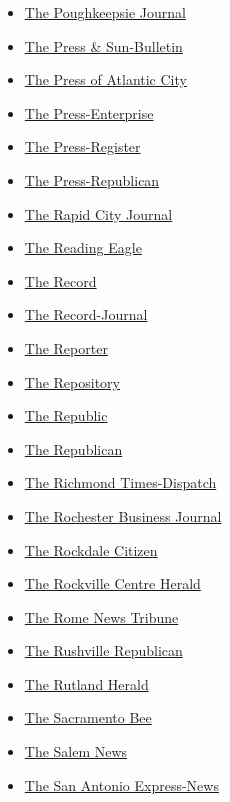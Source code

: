 \begin{itemize}
\item
  \href{https://www.poughkeepsiejournal.com/}{The Poughkeepsie Journal}
\item
  \href{https://www.pressconnects.com/}{The Press \& Sun-Bulletin}
\item
  \href{https://www.pressofatlanticcity.com/}{The Press of Atlantic
  City}
\item
  \href{https://www.pe.com/}{The Press-Enterprise}
\item
  \href{https://www.al.com/mobile/}{The Press-Register}
\item
  \href{https://www.pressrepublican.com/}{The Press-Republican}
\item
  \href{https://rapidcityjournal.com/}{The Rapid City Journal}
\item
  \href{https://www.readingeagle.com/}{The Reading Eagle}
\item
  \href{https://www.northjersey.com/}{The Record}
\item
  \href{https://www.myrecordjournal.com/}{The Record-Journal}
\item
  \href{https://dailyreporter.com/}{The Reporter}
\item
  \href{https://www.cantonrep.com/}{The Repository}
\item
  \href{http://www.therepublic.com/}{The Republic}
\item
  \href{https://springfieldrepublican-ma.newsmemory.com/}{The
  Republican}
\item
  \href{https://www.richmond.com/}{The Richmond Times-Dispatch}
\item
  \href{https://rbj.net/}{The Rochester Business Journal}
\item
  \href{https://www.rockdalenewtoncitizen.com/}{The Rockdale Citizen}
\item
  \href{https://www.liherald.com/rockvillecentre/}{The Rockville Centre
  Herald}
\item
  \href{https://www.northwestgeorgianews.com/rome/}{The Rome News
  Tribune}
\item
  \href{https://www.rushvillerepublican.com/}{The Rushville Republican}
\item
  \href{https://www.rutlandherald.com/}{The Rutland Herald}
\item
  \href{https://www.sacbee.com/}{The Sacramento Bee}
\item
  \href{https://www.salemnews.com/}{The Salem News}
\item
  \href{https://www.mysanantonio.com/}{The San Antonio Express-News}

\end{itemize}
